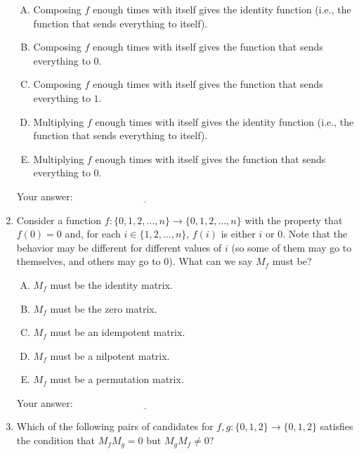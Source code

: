 \documentclass[10pt]{amsart}
\begin{document}
\begin{enumerate}
  \begin{enumerate}[(A)]
  \item Composing $f$ enough times with itself gives the identity
    function (i.e., the function that sends everything to itself).
  \item Composing $f$ enough times with itself gives the function that
    sends everything to $0$.
  \item Composing $f$ enough times with itself gives the function that
    sends everything to $1$.
  \item Multiplying $f$ enough times with itself gives the identity
    function (i.e., the function that sends everything to itself).
  \item Multiplying $f$ enough times with itself gives the function
    that sends everything to $0$.
  \end{enumerate}

  \vspace{0.1in}
  Your answer: $\underline{\qquad\qquad\qquad\qquad\qquad\qquad\qquad}$
  \vspace{0.1in}

\item Consider a function $f: \{ 0,1,2,\dots,n \} \to
  \{0,1,2,\dots,n\}$ with the property that $f(0) = 0$ and, for each
  $i \in \{ 1,2,\dots,n\}$, $f(i)$ is either $i$ or $0$. Note that the
  behavior may be different for different values of $i$ (so some of
  them may go to themselves, and others may go to $0$). What can we say
  $M_f$ must be?

  \begin{enumerate}[(A)]
  \item $M_f$ must be the identity matrix.
  \item $M_f$ must be the zero matrix.
  \item $M_f$ must be an idempotent matrix.
  \item $M_f$ must be a nilpotent matrix.
  \item $M_f$ must be a permutation matrix.
  \end{enumerate}

  \vspace{0.1in}
  Your answer: $\underline{\qquad\qquad\qquad\qquad\qquad\qquad\qquad}$
  \vspace{0.1in}

\item Which of the following pairs of candidates for $f,g: \{ 0,1,2 \}
  \to \{ 0,1,2 \}$ satisfies the condition that $M_fM_g = 0$ but
  $M_gM_f \ne 0$? 


\end{enumerate}
\end{document}
